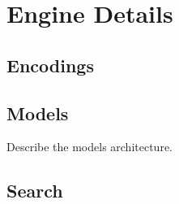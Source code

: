 \section{Engine Details}
\subsection{Encodings}
\subsection{Models}

Describe the models architecture.

\subsection{Search}
